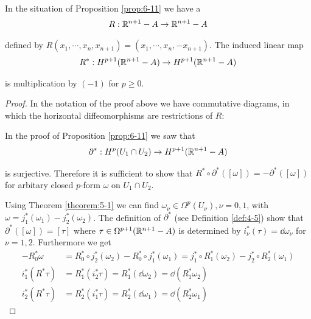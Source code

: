 \begin{addendum}\label{addendum:6-12}
  In the situation of Proposition \ref{prop:6-11} we have a 
  \begin{align*}
    R:\mathbb{R}^{n+1}-A \to \mathbb{R}^{n+1}-A
  \end{align*}

  defined by $R(x_1, \cdots, x_n, x_{n+1}) = (x_1, \cdots, x_n, -x_{n+1})$. The induced linear map
  \begin{align*}
    R^*:H^{p+1}(\mathbb{R}^{n+1} -A) \to H^{p+1}(\mathbb{R}^{n+1} - A)
  \end{align*}

  is multiplication by $(-1)$ for $p\ge 0$.
\end{addendum}

\begin{proof}
  In the notation of the proof above we have commutative diagrams, in
which the horizontal diffeomorphisms are restrictions of $R$:
\begin{center}
  \hspace*{3em}
\end{center}

In the proof of Proposition \ref{prop:6-11} we saw that
\begin{align*}
  \partial^*:H^p(U_1\cap U_2)\to H^{p+1}(\mathbb{R}^{n+1}-A)
\end{align*}

is surjective. Therefore it is sufficient to show that $R^*\circ\partial^*([\omega]) = -\partial^*([\omega])$
for arbitary closed $p$-form $\omega$ on $U_1\cap U_2$.

Using Theorem \ref{theorem:5-1} we can find $\omega_\nu\in\Omega^p(U_\nu),\nu=0,1$, with $\omega=j_1^*(\omega_1) -
j_2^*(\omega_2)$. The definition of $\partial^*$ (see Definition \ref{def:4-5}) show that $\partial^*([\omega]) = [\tau]$
where $\tau\in\Omega^{p+1}(\mathbb{R}^{n+1} - A)$ is determined by $i^*_\nu(\tau) = \dd\omega_\nu$ for $\nu=1, 2$. Furthermore we get 
\begin{align*}
  -R^*_0\omega & = R^*_0\circ j^*_2(\omega_2) - R^*_0\circ j^*_1(\omega_1) 
      = j^*_1\circ R^*_1(\omega_2) - j^*_2\circ R^*_2(\omega_1) \\
  i^*_1(R^*\tau) & = R^*_1(i^*_2\tau) = R^*_1(\dd\omega_2) = \dd(R^*_1\omega_2) \\
  i^*_2(R^*\tau) & = R^*_2(i^*_1\tau) = R^*_2(\dd\omega_1) = \dd(R^*_2\omega_1)
\end{align*}


\end{proof}
